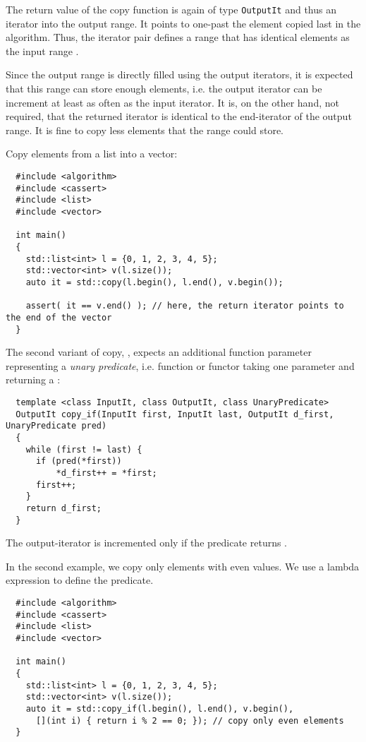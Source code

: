 The return value of the copy function is again of type \texttt{OutputIt} and thus an iterator into the output range. It points to one-past the element
copied last in the algorithm. Thus, the iterator pair \cpp{[d_first, return_value)} defines a range that has identical elements as the
input range \cpp{[first, last)}.

Since the output range is directly filled using the output iterators, it is expected that this range can store enough elements, i.e. the output iterator
can be increment at least as often as the input iterator. It is, on the other hand, not required, that the returned iterator is identical to the end-iterator
of the output range. It is fine to copy less elements that the range could store.

\begin{example}
  Copy elements from a list into a vector:
  \begin{verbatim}
  #include <algorithm>
  #include <cassert>
  #include <list>
  #include <vector>

  int main()
  {
    std::list<int> l = {0, 1, 2, 3, 4, 5};
    std::vector<int> v(l.size());
    auto it = std::copy(l.begin(), l.end(), v.begin());

    assert( it == v.end() ); // here, the return iterator points to the end of the vector
  }
  \end{verbatim}
\end{example}

The second variant of copy, , expects an additional function parameter representing a \emph{unary predicate}, i.e. function or functor
taking one parameter and returning a :
%
\begin{samepage}
\begin{verbatim}
  template <class InputIt, class OutputIt, class UnaryPredicate>
  OutputIt copy_if(InputIt first, InputIt last, OutputIt d_first, UnaryPredicate pred)
  {
    while (first != last) {
      if (pred(*first))
          *d_first++ = *first;
      first++;
    }
    return d_first;
  }
\end{verbatim}
\end{samepage}
%
The output-iterator is incremented only if the predicate returns .

\begin{example}
  In the second example, we copy only elements with even values. We use a lambda expression to define the predicate.
  \begin{verbatim}
  #include <algorithm>
  #include <cassert>
  #include <list>
  #include <vector>

  int main()
  {
    std::list<int> l = {0, 1, 2, 3, 4, 5};
    std::vector<int> v(l.size());
    auto it = std::copy_if(l.begin(), l.end(), v.begin(),
      [](int i) { return i % 2 == 0; }); // copy only even elements
  }
  \end{verbatim}
\end{example}


